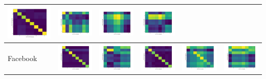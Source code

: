 \documentclass[12pt,german]{article}
\begin{document}
\begin{table}[H]
\begin{tabular}{| l | c | c | c | c | c |}
    \includegraphics[width=2.5cm]{../images/dictData/dictData.jpg} &
    \includegraphics[width=2.5cm]{../images/dictData/facebookData.jpg} &
    \includegraphics[width=2.5cm]{../images/dictData/googleData.jpg} &
    \includegraphics[width=2.5cm]{../images/dictData/witzData.jpg} \\   
    \hline
    Facebook &
    \includegraphics[width=2.5cm]{../images/facebookData/abstractData.jpg} &
    \includegraphics[width=2.5cm]{../images/facebookData/dictData.jpg} &
    \includegraphics[width=2.5cm]{../images/facebookData/facebookData.jpg} &
    \includegraphics[width=2.5cm]{../images/facebookData/googleData.jpg} &
    \includegraphics[width=2.5cm]{../images/facebookData/witzData.jpg} \\

\end{tabular}
\end{table}
\end{document}
